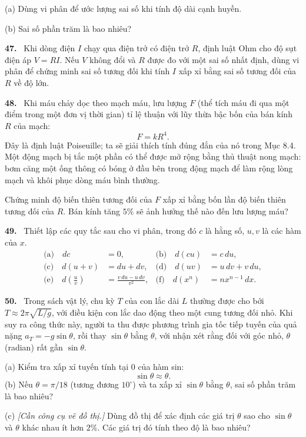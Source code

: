 \documentclass[12pt,a4paper]{article}
\newcommand{\bt}[1]{\par\smallskip\Needspace{5\baselineskip}\noindent\textbf{#1.}\ }
\begin{document}
(a) Dùng vi phân để ước lượng sai số khi tính độ dài cạnh huyền.

(b) Sai số phần trăm là bao nhiêu?

\bt{47} Khi dòng điện $I$ chạy qua điện trở có điện trở $R$, định luật Ohm cho độ sụt điện áp $V=RI$. Nếu $V$ không đổi và $R$ được đo với một sai số nhất định, dùng vi phân để chứng minh sai số tương đối khi tính $I$ xấp xỉ bằng sai số tương đối của $R$ về độ lớn.

\bt{48} Khi máu chảy dọc theo mạch máu, lưu lượng $F$ (thể tích máu đi qua một điểm trong một đơn vị thời gian) tỉ lệ thuận với lũy thừa bậc bốn của bán kính $R$ của mạch:
\[F=kR^4.\]
Đây là định luật Poiseuille; ta sẽ giải thích tính đúng đắn của nó trong Mục 8.4. Một động mạch bị tắc một phần có thể được mở rộng bằng thủ thuật nong mạch: bơm căng một ống thông có bóng ở đầu bên trong động mạch để làm rộng lòng mạch và khôi phục dòng máu bình thường.

Chứng minh độ biến thiên tương đối của $F$ xấp xỉ bằng bốn lần độ biến thiên tương đối của $R$. Bán kính tăng $5\%$ sẽ ảnh hưởng thế nào đến lưu lượng máu?

\bt{49} Thiết lập các quy tắc sau cho vi phân, trong đó $c$ là hằng số, $u,v$ là các hàm của $x$.
\begin{align*}
\text{(a)}\quad dc&=0,&\text{(b)}\quad d(cu)&=c\,du,\\
\text{(c)}\quad d(u+v)&=du+dv,&\text{(d)}\quad d(uv)&=u\,dv+v\,du,\\
\text{(e)}\quad d\left(\frac uv\right)&=\frac{v\,du-u\,dv}{v^2},&
\text{(f)}\quad d(x^n)&=nx^{n-1}\,dx.
\end{align*}

\bt{50} Trong sách vật lý, chu kỳ $T$ của con lắc dài $L$ thường được cho bởi $T\approx2\pi\sqrt{L/g}$, với điều kiện con lắc dao động theo một cung tương đối nhỏ. Khi suy ra công thức này, người ta thu được phương trình gia tốc tiếp tuyến của quả nặng $a_T=-g\sin\theta$, rồi thay $\sin\theta$ bằng $\theta$, với nhận xét rằng đối với góc nhỏ, $\theta$ (radian) rất gần $\sin\theta$.

(a) Kiểm tra xấp xỉ tuyến tính tại $0$ của hàm sin:
\[\sin\theta\approx\theta.\]
(b) Nếu $\theta=\pi/18$ (tương đương $10^\circ$) và ta xấp xỉ $\sin\theta$ bằng $\theta$, sai số phần trăm là bao nhiêu?

(c) \textit{[Cần công cụ vẽ đồ thị.]} Dùng đồ thị để xác định các giá trị $\theta$ sao cho $\sin\theta$ và $\theta$ khác nhau ít hơn $2\%$. Các giá trị đó tính theo độ là bao nhiêu?
\end{document}
